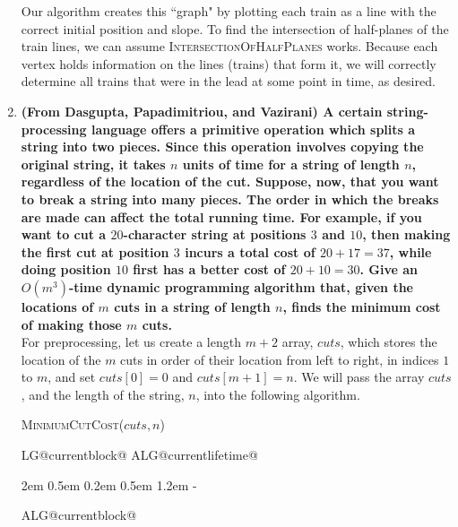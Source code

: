 \documentclass[11pt]{article}
\makeatletter
\newlength{\continueindent}
\renewenvironment{algorithmic}[1][0]%
   {%
   \edef\ALG@numberfreq{#1}%
   \def\@currentlabel{\theALG@line}%
   \setcounter{ALG@line}{0}%
   \setcounter{ALG@rem}{0}%
   \let\\\algbreak%
   \expandafter\edef\csname ALG@currentblock@\theALG@nested\endcsname{0}%
   \expandafter\let\csname ALG@currentlifetime@\theALG@nested\endcsname\relax%
   \begin{list}%
      {\ALG@step}%
      {%
      \rightmargin\z@%
      \itemsep\z@ \itemindent\z@ \listparindent2em%
      \partopsep\z@ \parskip\z@ \parsep\z@%
      \labelsep 0.5em \topsep 0.2em%
      \ifthenelse{\equal{#1}{0}}%
         {\labelwidth 0.5em}%
         {\labelwidth 1.2em}%
       \leftmargin\labelwidth \addtolength{\leftmargin}{\labelsep}
      \ALG@tlm\z@%
      }%
      \parshape 2 \leftmargin \linewidth \continueindent \dimexpr\linewidth-\continueindent\relax
   \setcounter{ALG@nested}{0}%
   \ALG@beginalgorithmic%
   }%
   {%
   \ALG@closeloops%
   \expandafter\ifnum\csname ALG@currentblock@\theALG@nested\endcsname=0\relax%
   \else%
      \PackageError{algorithmicx}{Some blocks are not closed!!!}{}%
   \fi%
   \ALG@endalgorithmic%
   \end{list}%
   }%
\makeatother
\begin{document}
\begin{enumerate}
Our algorithm creates this ``graph" by plotting each train as a line with the correct initial position and slope. To find the intersection of half-planes of the train lines, we can assume \textsc{IntersectionOfHalfPlanes} works. Because each vertex holds information on the lines (trains) that form it, we will correctly determine all trains that were in the lead at some point in time, as desired.

\newpage
\item\textbf{(From Dasgupta, Papadimitriou, and Vazirani) A certain string-processing language offers a primitive operation which splits a string into two pieces. Since this operation involves copying the original string, it takes $n$ units of time for a string of length $n$, regardless of the location of the cut. Suppose, now, that you want to break a string into many pieces. The order in which the breaks are made can affect the total running time. For example, if you want to cut a $20$-character string at positions $3$ and $10$, then making the first cut at position $3$ incurs a total cost of $20 + 17 = 37$, while doing position $10$ first has a better cost of $20 + 10 = 30$. Give an $O(m^3)$-time dynamic programming algorithm that, given the locations of $m$ cuts in a string of length $n$, finds the minimum cost of making those $m$ cuts.} \\

For preprocessing, let us create a length $m+2$ array, $cuts$, which stores the location of the $m$ cuts in order of their location from left to right, in indices $1$ to $m$, and set $cuts[0] = 0$ and $cuts[m+1] = n$. We will pass the array $cuts$, and the length of the string, $n$, into the following algorithm.

\begin{minipage}[t]{0.9\textwidth}
    \begin{algorithm}[H]
    \caption{\textsc{MinimumCutCost}($cuts, n$)}
    \begin{algorithmic}[1]
            \Else
            \EndIf
        \EndFor
        \EndFor
            \EndIf


\end{algorithmic}
\end{algorithm}
\end{minipage}
\end{enumerate}
\end{document}
